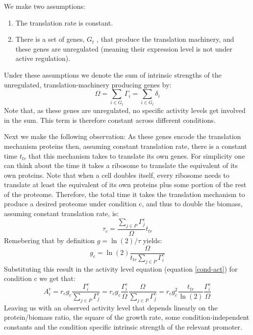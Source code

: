 \documentclass{report}
\begin{document}
We make two assumptions:
\begin{enumerate}
\item The translation rate is constant.
\item There is a set of genes, $G_t$ , that produce the translation machinery, and these genes are unregulated (meaning their expression level is not under active regulation).
\end{enumerate}
Under these assumptions we denote the sum of intrinsic strengths of the unregulated, translation-machinery producing genes by:
\[\Omega=\sum_{i \in G_t}\Gamma_i=\sum_{i \in G_t}\delta_i\]
Note that, as these genes are unregulated, no specific activity levels get involved in the sum.
This term is therefore constant across different conditions.

Next we make the following observation:
As these genes encode the translation mechanism proteins then, assuming constant translation rate, there is a constant time $t_{tr}$ that this mechanism takes to translate its own genes.
For simplicity one can think about the time it takes a ribosome to translate the equivalent of its own proteins.
Note that when a cell doubles itself, every ribosome needs to translate at least the equivalent of its own proteins plus some portion of the rest of the proteome.
Therefore, the total time it takes the translation mechanism to produce a desired proteome under condition c, and thus to double the biomass, assuming constant translation rate, is:
\[\tau_c=\frac{\sum_{j\in P}\Gamma^c_j}{\Omega}t_{tr}\]
Remebering that by  definition $g=\ln(2)/\tau$ yields:
\[g_c=\ln(2)\frac{\Omega}{t_{tr}\sum_{j\in P}\Gamma^c_i}\]
Substituting this result in the activity level equation (equation \ref{cond-act}) for condition c we get that:
\begin{equation}
\label{ind-act}
A^c_i=r_c g_c \frac{\Gamma^c_i}{\sum_{j\in P}\Gamma^c_j}=r_c g_c \frac{\Gamma^c_i}{\Omega}\frac{\Omega}{\sum_{j\in P}\Gamma^c_j}=r_c g_c^2\frac{t_{tr}}{\ln(2)}\frac{\Gamma^c_i}{\Omega}
\end{equation}
Leaving us with an observed activity level that depends linearly on the protein/biomass ratio, the square of the growth rate, some condition-independent constants and the condition specific intrinsic strength of the relevant promoter.
\end{document}
